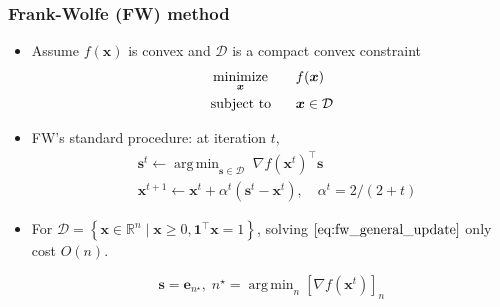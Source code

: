 \documentclass[10pt,xcolor={usenames,dvipsnames,table}]{beamer}
\def\blue{\color{blue}}
\newcommand{\set}[1]{\left\{#1\right\}}
\newcommand{\T}{\!\top\!}
\DeclareMathOperator*{\argmin}{arg\,min}
\DeclareMathOperator*{\minimize}{minimize}
\newcommand{\citep}[1]{{\blue \scriptsize \parencite{#1}}}
\begin{document}
\begin{frame}
    \frametitle{Frank-Wolfe (FW) method \citep{frank1956algorithm}}
    \begin{itemize}
        \item Assume $f(\bm{x})$ is convex and $\mathcal{D}$ is a compact convex constraint 
    \begin{alignat*}{2}
        & \minimize_{\bm{x}} \quad && f(\bm{x}) \\
        & \text{\rm subject to} && \bm{x} \in \mathcal{D}
    \end{alignat*}
        \item FW's standard procedure: at iteration $t$,
        \begin{align}
        &\bm{s}^{t} \leftarrow \argmin_{\bm{s} \in \mathcal{D}} \; \nabla f(\bm{x}^{t})^{\T} \bm{s} \label{eq:fw_general_update}\\
        &\bm{x}^{t+1} \leftarrow \bm{x}^{t} + \alpha^{t} (\bm{s}^{t} - \bm{x}^{t}) , \quad \alpha^{t}=2/(2+t) \nonumber
        \end{align}

        \item For $\mathcal{D} = \set{\bm{x} \in \mathbb{R}^{n} \mid \bm{x} \geq 0, \bm{1}^{\T}\bm{x} = 1}$, solving $\eqref{eq:fw_general_update}$ only cost $O(n)$.

    \[
    \bm{s} = \bm{e}_{n^{\star}}, \; n^{\star} = \argmin_{n} [\nabla f(\bm{x}^{t})]_n
    \] 
    \end{itemize}
    
\end{frame}
\end{document}
